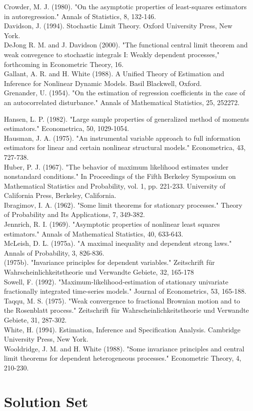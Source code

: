 \documentclass[10pt]{article}
\begin{document}
Crowder, M. J. (1980). "On the asymptotic properties of least-squares estimators in autoregression." Annals of Statistics, 8, 132-146.\\
Davidson, J. (1994). Stochastic Limit Theory. Oxford University Press, New York.\\
DeJong R. M. and J. Davidson (2000). "The functional central limit theorem and weak convegence to stochastic integrals I: Weakly dependent processes," forthcoming in Econometric Theory, 16.\\
Gallant, A. R. and H. White (1988). A Unified Theory of Estimation and Inference for Nonlinear Dynamic Models. Basil Blackwell, Oxford.\\
Grenander, U. (1954). "On the estimation of regression coefficients in the case of an autocorrelated disturbance." Annals of Mathematical Statistics, 25, 252272.

Hansen, L. P. (1982). "Large sample properties of generalized method of moments estimators." Econometrica, 50, 1029-1054.\\
Hausman, J. A. (1975). "An instrumental variable approach to full information estimators for linear and certain nonlinear structural models." Econometrica, 43, 727-738.\\
Huber, P. J. (1967). "The behavior of maximum likelihood estimates under nonstandard conditions." In Proceedings of the Fifth Berkeley Symposium on Mathematical Statistics and Probability, vol. 1, pp. 221-233. University of California Press, Berkeley, California.\\
Ibragimov, I. A. (1962). "Some limit theorems for stationary processes." Theory of Probability and Its Applications, 7, 349-382.\\
Jennrich, R. I. (1969). "Asymptotic properties of nonlinear least squares estimators." Annals of Mathematical Statistics, 40, 633-643.\\
McLeish, D. L. (1975a). "A maximal inequality and dependent strong laws." Annals of Probability, 3, 826-836.\\
(1975b). "Invariance principles for dependent variables." Zeitschrift für Wahrscheinlichkeitstheorie und Verwandte Gebiete, 32, 165-178\\
Sowell, F. (1992). "Maximum-likelihood-estimation of stationary univariate fractionally integrated time-series models." Journal of Econometrics, 53, 165-188.\\
Taqqu, M. S. (1975). "Weak convergence to fractional Brownian motion and to the Rosenblatt process." Zeitschrift für Wahrscheinlichkeitstheorie und Verwandte Gebiete, 31, 287-302.\\
White, H. (1994). Estimation, Inference and Specification Analysis. Cambridge University Press, New York.\\
Wooldridge, J. M. and H. White (1988). "Some invariance principles and central limit theorems for dependent heterogeneous processes." Econometric Theory, 4, 210-230.

\section*{Solution Set}
\end{document}
